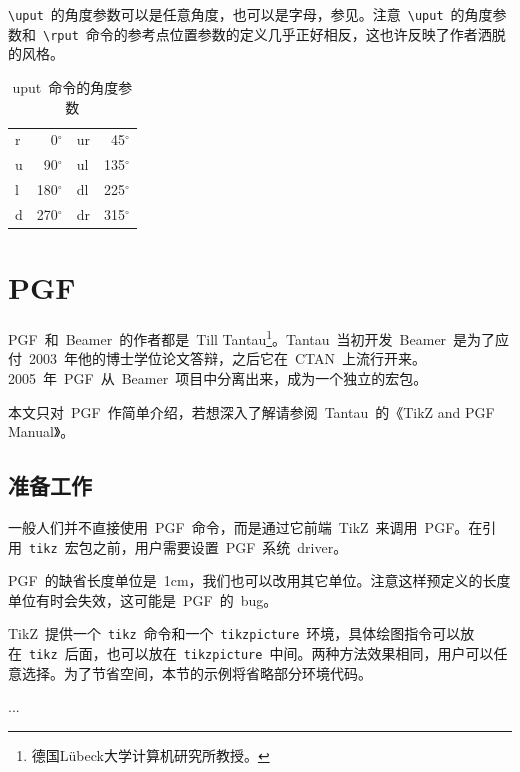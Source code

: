 \verb|\uput|~的角度参数可以是任意角度，也可以是字母，参见。注意~\verb|\uput|~的角度参数和~\verb|\rput|~命令的参考点位置参数的定义几乎正好相反，这也许反映了作者洒脱的风格。

\begin{table}[htbp]
\caption{uput~命令的角度参数}
\label{tab:uput}
\centering
\begin{tabular}{lrlr}
    \toprule
    r &   0$^\circ$ & ur &  45$^\circ$ \\
    u &  90$^\circ$ & ul & 135$^\circ$ \\
    l & 180$^\circ$ & dl & 225$^\circ$ \\
    d & 270$^\circ$ & dr & 315$^\circ$ \\
    \bottomrule
\end{tabular}
\end{table}

\section{PGF}
\label{sec:pgf}
PGF~和~Beamer~的作者都是~Till Tantau\footnote{德国Lübeck大学计算机研究所教授。}。Tantau~当初开发~Beamer~是为了应付~2003~年他的博士学位论文答辩，之后它在~CTAN~上流行开来。2005~年~PGF~从~Beamer~项目中分离出来，成为一个独立的宏包。

本文只对~PGF~作简单介绍，若想深入了解请参阅~Tantau~的《TikZ and PGF Manual》\citep{Tantau_2008}。

\subsection{准备工作}
一般人们并不直接使用~PGF~命令，而是通过它前端~TikZ~来调用~PGF。在引用~\verb|tikz|~宏包之前，用户需要设置~PGF~系统~driver。
\begin{code}
\def\pgfsysdriver{pgfsys-dvipdfmx.def}
\usepackage{tikz}
\end{code}

PGF~的缺省长度单位是~1cm，我们也可以改用其它单位。注意这样预定义的长度单位有时会失效，这可能是~PGF~的~bug。
\begin{code}
\end{code}

TikZ~提供一个~\verb|tikz|~命令和一个~\verb|tikzpicture|~环境，具体绘图指令可以放在~\verb|tikz|~后面，也可以放在~\verb|tikzpicture|~中间。两种方法效果相同，用户可以任意选择。为了节省空间，本节的示例将省略部分环境代码。
\begin{code}
\tikz ...   %
\end{code}

